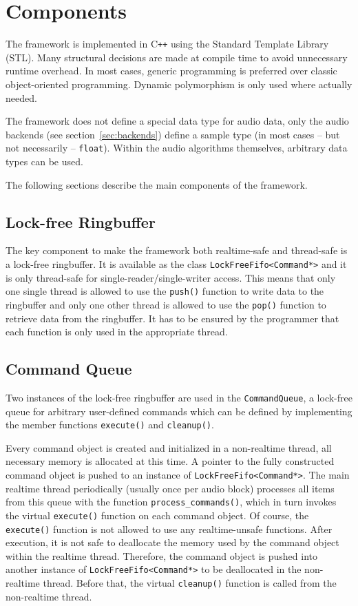 \documentclass[11pt,letterpaper]{article}
\newcommand{\code}{\texttt}
\begin{document}
\section{Components}

The framework is implemented in C\texttt{++} using the 
Standard Template Library (STL).
Many structural decisions are made at compile time to avoid unnecessary runtime
overhead.
In most cases, generic programming is preferred over classic object-oriented
programming.
Dynamic polymorphism is only used where actually needed.

The framework does not define a special data type for audio data, only the audio
backends (see section~\ref{sec:backends}) define a sample type (in most cases -- but not necessarily --
\code{float}).
Within the audio algorithms themselves, arbitrary data types can be used.

The following sections describe the main components of the framework.

\subsection{Lock-free Ringbuffer}

The key component to make the framework both realtime-safe and thread-safe is a
lock-free ringbuffer.
It is available as the class \code{LockFreeFifo<Command*>} and it is only
thread-safe for single-reader/single-writer access.
This means that only one single thread is allowed to use the \code{push()}
function to write data to the ringbuffer and only one other thread is allowed to
use the \code{pop()} function to retrieve data from the ringbuffer.
It has to be ensured by the programmer that each function is only used in the
appropriate thread.

\subsection{Command Queue}

\label{sec:commandqueue}

Two instances of the lock-free ringbuffer are used in the \code{CommandQueue}, a lock-free queue
for arbitrary user-defined commands which
can be defined by implementing the member functions \code{execute()} and
\code{cleanup()}.

Every command object is created and initialized in a non-realtime thread, all
necessary memory is allocated at this time.
A pointer to the fully constructed command object is pushed to an
instance of \code{LockFreeFifo<Command*>}.
The main realtime thread periodically (usually once per audio block) processes all
items from this queue with the
function \code{process\string_commands()}, which in turn invokes the
virtual \code{execute()} function on each command object.
Of course, the \code{execute()} function is not allowed to use any
realtime-unsafe functions.
After execution, it is not safe to deallocate the memory used by the command
object within the realtime thread.
Therefore, the command object is pushed into another instance of
\code{LockFreeFifo<Command*>} to be deallocated in the non-realtime thread.
Before that, the virtual \code{cleanup()} function is called from the
non-realtime thread.
\end{document}
